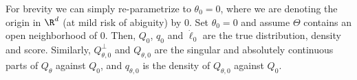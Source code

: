 For brevity we can simply re-parametrize to \(\theta_{0} = 0\), where we are
denoting the origin in \(\R^{d}\) (at mild risk of abiguity) by \(0\).
Set \(\theta_{0} = 0\) and assume \(\Theta\) contains an open neighborhood of
\(0\).
Then, \(Q_{0}\), \(q_{0}\) and \(\dot{\ell}_{0}\) are the true distribution,
density and score.
Similarly, \(Q_{\theta, 0}^{\perp}\) and \(Q_{\theta, 0}\) are the singular and
absolutely continuous parts of \(Q_{\theta}\) against \(Q_{0}\), and
\(q_{\theta, 0}\) is the density of \(Q_{\theta, 0}\) against \(Q_{0}\).

